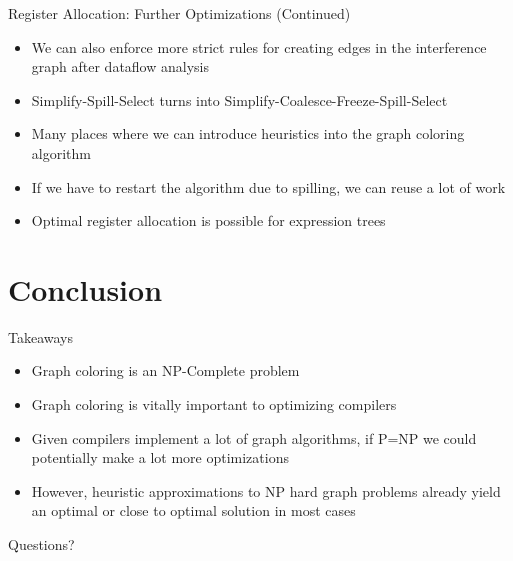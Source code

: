 \documentclass[aspectratio=169]{beamer}
\begin{document}
\begin{frame}{Register Allocation: Further Optimizations (Continued)}
    \begin{itemize}
        \item We can also enforce more strict rules for creating edges in the interference graph after dataflow analysis
        \item Simplify-Spill-Select turns into Simplify-Coalesce-Freeze-Spill-Select
        \item Many places where we can introduce heuristics into the graph coloring algorithm
        \item If we have to restart the algorithm due to spilling, we can reuse a lot of work
        \pause
        \item Optimal register allocation is possible for expression trees
    \end{itemize}
\end{frame}

\section{Conclusion}
\frame{\sectionpage}

\begin{frame}{Takeaways}
    \begin{itemize}
        \item Graph coloring is an NP-Complete problem
        \item Graph coloring is vitally important to optimizing compilers
        \item Given compilers implement a lot of graph algorithms, if P=NP we could potentially make a lot more optimizations
        \pause
        \item However, heuristic approximations to NP hard graph problems already yield an optimal or close to optimal solution in most cases
    \end{itemize}
\end{frame}

\begin{frame}{}
      \begin{center}
    {\color{sigma@mainblue} \LARGE Questions?}
  \end{center}
\end{frame}
\end{document}
